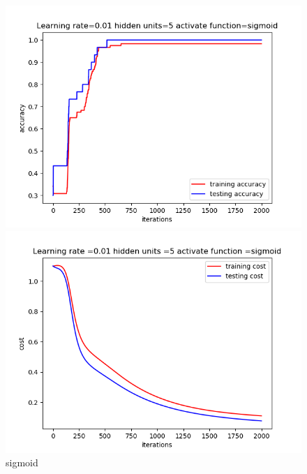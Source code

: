 \documentclass{article}
\begin{document}
\begin{figure}[htb]
\begin{minipage}[t]{0.5\linewidth}
    \includegraphics[scale=0.3]{accuracy_sigmoid_5.png} 
    \end{minipage}%
    \begin{minipage}[t]{0.5\linewidth} 
    \centering 
    \includegraphics[scale=0.3]{cost_sigmoid_5.png} 
    \end{minipage}%
    \centering 
    \caption{sigmoid}
    \centering 
    \begin{minipage}[t]{0.5\linewidth}
    \centering 

\end{minipage}
\end{figure}
\end{document}
